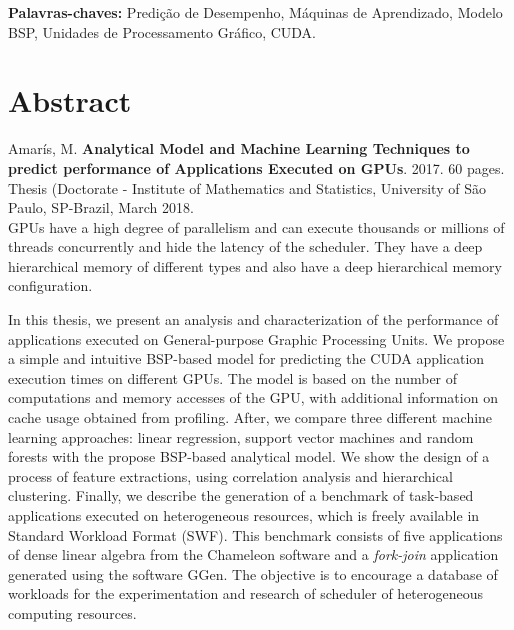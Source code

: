\documentclass[openany,11pt,twoside,a4paper]{book}
\begin{document}
\noindent \textbf{Palavras-chaves:} Predi\c{c}\~{a}o de Desempenho, M\'{a}quinas de Aprendizado,  Modelo BSP, Unidades de Processamento Gráfico, CUDA.
\chapter*{Abstract}
\noindent Amar\'{i}s, M. \textbf{Analytical Model and Machine Learning Techniques to predict performance of Applications Executed on GPUs}. 
2017. 60 pages.
Thesis (Doctorate - Institute of Mathematics and Statistics, University of S\~{a}o Paulo, SP-Brazil, March 2018.
\\
GPUs have a high degree of parallelism and can execute thousands or millions of threads concurrently and hide the latency of the scheduler. They have a deep hierarchical memory of different types and also have a deep hierarchical memory configuration.


In this thesis, we present an analysis and characterization of the performance of applications executed on General-purpose Graphic Processing Units.
We propose a simple and intuitive BSP-based model for predicting the CUDA application execution times on different GPUs. The model is based on the number of computations and memory accesses of the GPU, with additional information on cache usage obtained from profiling. After, we compare three different machine learning approaches: linear regression, support vector machines and random forests with the propose BSP-based analytical model. We show the design of a process of feature extractions, using correlation analysis and hierarchical clustering. Finally, we describe the generation of a benchmark of task-based applications executed on heterogeneous resources, which is freely available in Standard Workload Format (SWF). This benchmark consists of five applications of dense linear algebra from the Chameleon software and a \emph{fork-join} application generated using the software GGen. The objective is to encourage a database of workloads for the experimentation and research of scheduler of heterogeneous computing resources. \\
\end{document}
